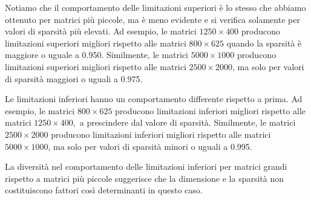 Notiamo che il comportamento delle limitazioni superiori è lo stesso che abbiamo ottenuto per matrici più piccole, ma è
meno evidente e si verifica solamente per valori di sparsità più elevati. Ad esempio, le matrici
\(
    1250\times 400
\)
producono limitazioni superiori migliori rispetto alle matrici
\(
    800\times 625
\)
quando la sparsità è maggiore o uguale a 0.950. Similmente, le matrici
\(
    5000\times 1000
\)
producono limitazioni superiori migliori rispetto alle matrici \( 2500\times 2000 \), ma solo per valori di sparsità
maggiori o uguali a 0.975.

Le limitazioni inferiori hanno un comportamento differente rispetto a prima. Ad esempio, le matrici \( 800\times 625 \)
producono limitazioni inferiori migliori rispetto alle matrici
\(
    1250\times 400,
\)
a prescindere dal valore di sparsità. Similmente, le matrici \( 2500\times 2000 \) producono limitazioni inferiori
migliori rispetto alle matrici \( 5000\times 1000 \), ma solo per valori di sparsità minori o uguali a 0.995.

La diversità nel comportamento delle limitazioni inferiori per matrici grandi rispetto a matrici più piccole suggerisce
che la dimensione e la sparsità non costituiscono fattori così determinanti in questo caso.

